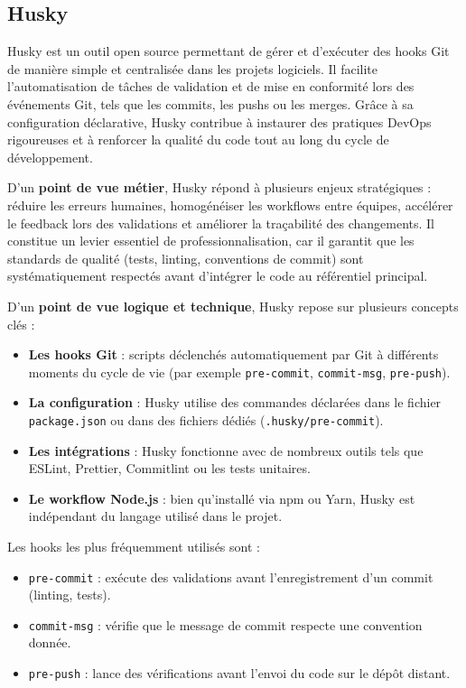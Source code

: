 \subsection{Husky}

Husky est un outil open source permettant de gérer et d’exécuter des hooks Git de manière simple et centralisée dans les projets logiciels. Il facilite l’automatisation de tâches de validation et de mise en conformité lors des événements Git, tels que les commits, les pushs ou les merges. Grâce à sa configuration déclarative, Husky contribue à instaurer des pratiques DevOps rigoureuses et à renforcer la qualité du code tout au long du cycle de développement.

D’un \textbf{point de vue métier}, Husky répond à plusieurs enjeux stratégiques  : réduire les erreurs humaines, homogénéiser les workflows entre équipes, accélérer le feedback lors des validations et améliorer la traçabilité des changements. Il constitue un levier essentiel de professionnalisation, car il garantit que les standards de qualité (tests, linting, conventions de commit) sont systématiquement respectés avant d’intégrer le code au référentiel principal.

D’un \textbf{point de vue logique et technique}, Husky repose sur plusieurs concepts clés  :
\begin{itemize}
	\item \textbf{Les hooks Git}  : scripts déclenchés automatiquement par Git à différents moments du cycle de vie (par exemple \texttt{pre-commit}, \texttt{commit-msg}, \texttt{pre-push}).
	\item \textbf{La configuration}  : Husky utilise des commandes déclarées dans le fichier \texttt{package.json} ou dans des fichiers dédiés (\texttt{.husky/pre-commit}).
	\item \textbf{Les intégrations}  : Husky fonctionne avec de nombreux outils tels que ESLint, Prettier, Commitlint ou les tests unitaires.
	\item \textbf{Le workflow Node.js}  : bien qu’installé via npm ou Yarn, Husky est indépendant du langage utilisé dans le projet.
\end{itemize}

Les hooks les plus fréquemment utilisés sont  :
\begin{itemize}
	\item \texttt{pre-commit}  : exécute des validations avant l’enregistrement d’un commit (linting, tests).
	\item \texttt{commit-msg}  : vérifie que le message de commit respecte une convention donnée.
	\item \texttt{pre-push}  : lance des vérifications avant l’envoi du code sur le dépôt distant.
\end{itemize}

